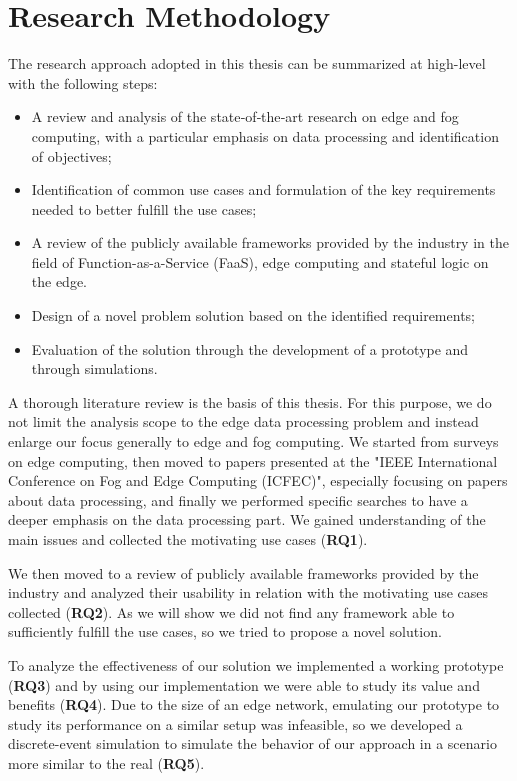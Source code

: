 \section{Research Methodology}
The research approach adopted in this thesis can be summarized at high-level with the following steps:
\begin{itemize}
    \item A review and analysis of the state‐of‐the‐art research on edge and fog computing, with a particular emphasis on data processing and identification of objectives;
    
    \item Identification of common use cases and formulation of the key requirements needed to better fulfill the use cases;
    
    \item A review of the publicly available frameworks provided by the industry in the field of Function-as-a-Service (FaaS), edge computing and stateful logic on the edge. 
    
    \item Design of a novel problem solution based on the identified requirements;
    
    \item Evaluation of the solution through the development of a prototype and through simulations.
\end{itemize}
A thorough literature review is the basis of this thesis. For this purpose, we do not limit the analysis scope to the edge data processing problem and instead enlarge our focus generally to edge and fog computing. We started from surveys on edge computing, then moved to papers presented at the "IEEE International Conference on Fog and Edge Computing (ICFEC)", especially focusing on papers about data processing, and finally we performed specific searches to have a deeper emphasis on the data processing part.
We gained understanding of the main issues and collected the motivating use cases (\textbf{RQ1}).

We then moved to a review of publicly available frameworks provided by the industry and analyzed their usability in relation with the motivating use cases collected (\textbf{RQ2}). As we will show we did not find any framework able to sufficiently fulfill the use cases, so we tried to propose a novel solution.

To analyze the effectiveness of our solution we implemented a working prototype (\textbf{RQ3}) and by using our implementation we were able to study its value and benefits (\textbf{RQ4}). Due to the size of an edge network, emulating our prototype to study its performance on a similar setup was infeasible, so we developed a discrete-event simulation to simulate the behavior of our approach in a scenario more similar to the real (\textbf{RQ5}).

